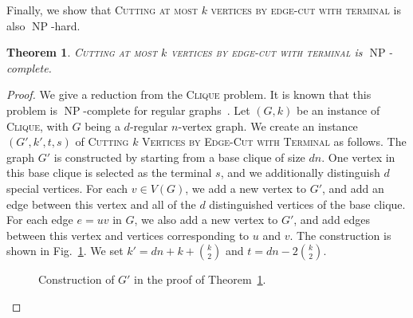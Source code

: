\documentclass[a4paper,11pt]{article}
\newtheorem{theorem}{Theorem}
\theoremstyle{definition}
\theoremstyle{remark}
\DeclareMathOperator{\operatorClassNP}{NP}
\newcommand{\classNP}{\ensuremath{\operatorClassNP}}
\begin{document}
Finally, we show that \textsc{Cutting at most  $k$ vertices by edge-cut with terminal} is also \classNP-hard.

\begin{theorem}\label{thm:sec_terminal_np}
\textsc{Cutting at most  $k$ vertices by edge-cut with terminal} is \classNP-complete.
\end{theorem}

\begin{proof}
We give a reduction from the \textsc{Clique} problem. It is known that this problem is \classNP-complete for regular graphs~\cite{GareyJ79}. Let $(G,k)$ be an instance of \textsc{Clique}, with $G$ being a $d$-regular $n$-vertex graph. We create an instance $(G', k', t, s)$ of \textsc{Cutting $k$ Vertices by Edge-Cut with Terminal} as follows. The graph $G'$ is constructed by starting from a base clique of size $d n$. One vertex in this base clique is selected as the terminal $s$, and we additionally distinguish $d$ special vertices. For each $v \in V(G)$, we add a new vertex to $G'$, and add an edge between this vertex and all of the $d$ distinguished vertices of the base clique. For each edge $ e = uv$ in $G$, we also add a new vertex to $G'$, and add edges between this vertex and vertices corresponding to $u$ and $v$.
The construction is shown in Fig.~\ref{fig:NPc}.
We set $k' = dn + k + \binom{k}{2}$ and $t = d n - 2 \binom{k}{2}$.


\begin{figure}[ht]
\centering{}
\caption{Construction of $G'$ in the proof of Theorem~\ref{thm:sec_terminal_np}.
\label{fig:NPc}}
\end{figure}



\end{proof}
\end{document}
